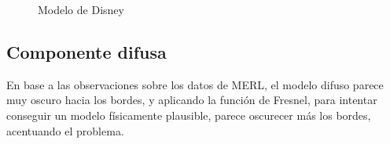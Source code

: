     \begin{figure}[H]
        \vspace{0.5cm}
        \centering
        \caption{Modelo de Disney}
        \vspace{0.5cm}
    \end{figure}
        
        \subsection{Componente difusa}
    
        En base a las observaciones sobre los datos de MERL, el modelo difuso parece muy oscuro hacia los bordes, y aplicando
        la funci\'on de Fresnel, para intentar conseguir un modelo f\'isicamente plausible, parece oscurecer m\'as los bordes,
        acentuando el problema.\\

